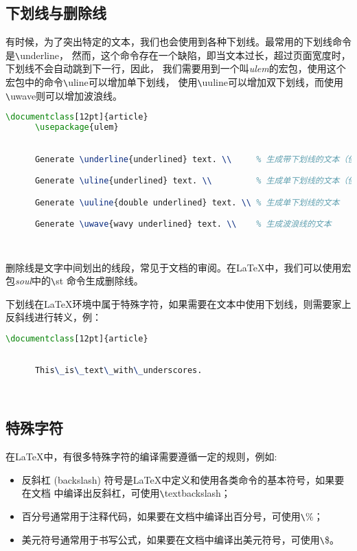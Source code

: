 {\subsection{下划线与删除线}
有时候，为了突出特定的文本，我们也会使用到各种下划线。最常用的下划线命令是\verb|\|underline，
然而，这个命令存在一个缺陷，即当文本过长，超过页面宽度时，下划线不会自动跳到下一行，因此，
我们需要用到一个叫\emph{ulem}的宏包，使用这个宏包中的命令\verb|\|uline可以增加单下划线，
使用\verb|\|uuline可以增加双下划线，而使用\verb|\|uwave则可以增加波浪线。

\begin{lstlisting}[language=TeX]
      \documentclass[12pt]{article}
      \usepackage{ulem}
      

      Generate \underline{underlined} text. \\     % 生成带下划线的文本（使用\underline命令）

      Generate \uline{underlined} text. \\         % 生成单下划线的文本（使用\uline命令）

      Generate \uuline{double underlined} text. \\ % 生成单下划线的文本

      Generate \uwave{wavy underlined} text. \\    % 生成波浪线的文本

      
\end{lstlisting}

删除线是文字中间划出的线段，常见于文档的审阅。在LaTeX中，我们可以使用宏包\emph{soul}中的\verb|\|st
命令生成删除线。

下划线在LaTeX环境中属于特殊字符，如果需要在文本中使用下划线，则需要家上反斜线进行转义，例：
\begin{lstlisting}[language=TeX]
      \documentclass[12pt]{article}
      

      This\_is\_text\_with\_underscores.

      
\end{lstlisting}

\subsection{特殊字符}
在LaTeX中，有很多特殊字符的编译需要遵循一定的规则，例如:
\begin{itemize}
      \item 反斜杠 (backslash) 符号是LaTeX中定义和使用各类命令的基本符号，如果要在文档
            中编译出反斜杠，可使用\verb|\|textbackslash；
      \item 百分号通常用于注释代码，如果要在文档中编译出百分号，可使用\verb|\|\%；
      \item 美元符号通常用于书写公式，如果要在文档中编译出美元符号，可使用\verb|\|\$。
\end{itemize}

}
